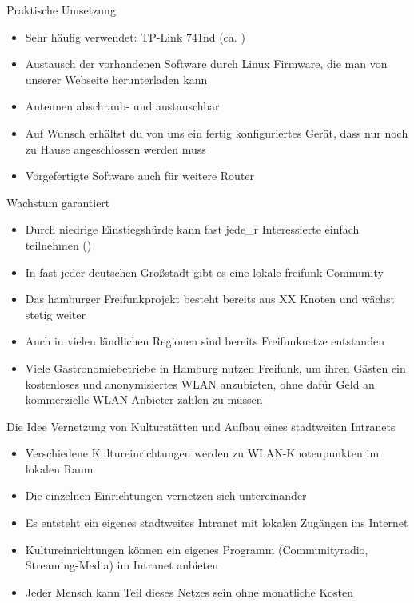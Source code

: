\documentclass[aspectratio=43]{beamer}
\begin{document}
\begin{frame}{Praktische Umsetzung}
	\begin{itemize}
		\item Sehr häufig verwendet: TP-Link 741nd (ca. )
		\item Austausch der vorhandenen Software durch Linux Firmware, die man von unserer Webseite herunterladen kann
		\item Antennen abschraub- und austauschbar
		\item Auf Wunsch erhältst du von uns ein fertig konfiguriertes Gerät, dass nur noch zu Hause angeschlossen werden muss
		\item Vorgefertigte Software auch für weitere Router
	\end{itemize}
\end{frame}

\begin{frame}{Wachstum garantiert}
	\begin{itemize}
		\item Durch niedrige Einstiegshürde kann fast jede\_r Interessierte einfach teilnehmen ()
		\item In fast jeder deutschen Großstadt gibt es eine lokale freifunk-Community
		\item Das hamburger Freifunkprojekt besteht bereits aus XX Knoten und wächst stetig weiter %
		\item Auch in vielen ländlichen Regionen sind bereits Freifunknetze entstanden
		\item Viele Gastronomiebetriebe in Hamburg nutzen Freifunk, um ihren Gästen ein kostenloses und anonymisiertes WLAN anzubieten, ohne dafür Geld an kommerzielle WLAN Anbieter zahlen zu müssen %
	\end{itemize}
\end{frame}

\begin{frame}{Die Idee}
	Vernetzung von Kulturstätten und Aufbau eines stadtweiten Intranets
	\begin{itemize}
		\item Verschiedene Kultureinrichtungen werden zu WLAN-Knotenpunkten im lokalen Raum
		\item Die einzelnen Einrichtungen vernetzen sich untereinander
		\item Es entsteht ein eigenes stadtweites Intranet mit lokalen Zugängen ins Internet
		\item Kultureinrichtungen können ein eigenes Programm (Communityradio, Streaming-Media) im Intranet anbieten
		\item Jeder Mensch kann Teil dieses Netzes sein ohne monatliche Kosten
	\end{itemize}
\end{frame}
\end{document}

